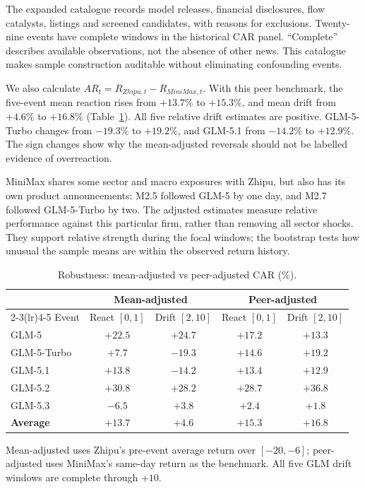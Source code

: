 \documentclass[11pt]{article}
\begin{document}
The expanded catalogue records model releases, financial disclosures, flow catalysts, listings and screened candidates, with reasons for exclusions. Twenty-nine events have complete windows in the historical CAR panel. ``Complete'' describes available observations, not the absence of other news. This catalogue makes sample construction auditable without eliminating confounding events.

We also calculate $AR_t=R_{Zhipu,t}-R_{MiniMax,t}$. With this peer benchmark, the five-event mean reaction rises from $+13.7\%$ to $+15.3\%$, and mean drift from $+4.6\%$ to $+16.8\%$ (Table~\ref{tab:robust}). All five relative drift estimates are positive. GLM-5-Turbo changes from $-19.3\%$ to $+19.2\%$, and GLM-5.1 from $-14.2\%$ to $+12.9\%$. The sign changes show why the mean-adjusted reversals should not be labelled evidence of overreaction.

MiniMax shares some sector and macro exposures with Zhipu, but also has its own product announcements: M2.5 followed GLM-5 by one day, and M2.7 followed GLM-5-Turbo by two. The adjusted estimates measure relative performance against this particular firm, rather than removing all sector shocks. They support relative strength during the focal windows; the bootstrap tests how unusual the sample means are within the observed return history.

\begin{table}[H]
\centering
\caption{Robustness: mean-adjusted vs peer-adjusted CAR (\%).}
\label{tab:robust}
\begin{tabular}{lcccc}
\toprule
 & \multicolumn{2}{c}{Mean-adjusted} & \multicolumn{2}{c}{Peer-adjusted} \\
\cmidrule(lr){2-3}\cmidrule(lr){4-5}
Event & React $[0,1]$ & Drift $[2,10]$ & React $[0,1]$ & Drift $[2,10]$ \\
\midrule
GLM-5 & $+22.5$ & $+24.7$ & $+17.2$ & $+13.3$ \\
GLM-5-Turbo & $+7.7$ & $-19.3$ & $+14.6$ & $+19.2$ \\
GLM-5.1 & $+13.8$ & $-14.2$ & $+13.4$ & $+12.9$ \\
GLM-5.2 & $+30.8$ & $+28.2$ & $+28.7$ & $+36.8$ \\
GLM-5.3 & $-6.5$ & $+3.8$ & $+2.4$ & $+1.8$ \\
\midrule
\textbf{Average} & $+13.7$ & $+4.6$ & $+15.3$ & $+16.8$ \\
\bottomrule
\end{tabular}

{\footnotesize Mean-adjusted uses Zhipu's pre-event average return over $[-20,-6]$; peer-adjusted uses
MiniMax's same-day return as the benchmark. All five GLM drift windows are complete through $+10$.}
\end{table}
\end{document}
